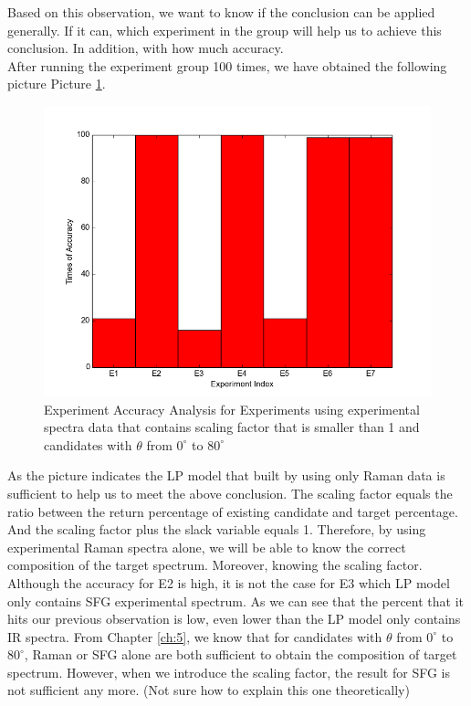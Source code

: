 Based on this observation, we want to know if the conclusion can be applied generally. If it can, which experiment in the group will help us to achieve this conclusion. In addition, with how much accuracy. \\

After running the experiment group 100 times, we have obtained the following picture Picture \ref{fig:6.1}.\\

\begin{figure}[!ht] \label{fig:6.1}
\centering
\includegraphics[scale=0.3]{Figures/chapter6_1.png}
\caption{Experiment Accuracy Analysis for Experiments using experimental spectra data that contains scaling factor that is smaller than 1 and candidates with $\theta$ from $0^{\circ}$ to $80^{\circ}$}
\end{figure}

As the picture indicates the LP model that built by using only Raman data is sufficient to help us to meet the above conclusion. The scaling factor equals the ratio between the return percentage of existing candidate and target percentage. And the scaling factor plus the slack variable equals 1. Therefore, by using experimental Raman spectra alone, we will be able to know the correct composition of the target spectrum. Moreover, knowing the scaling factor. \\
Although the accuracy for E2 is high, it is not the case for E3 which LP model only contains SFG experimental spectrum. As we can see that the percent that it hits our previous observation is low, even lower than the LP model only contains IR spectra. From Chapter \ref{ch:5}, we know that for candidates with $\theta$ from $0^{\circ}$ to $80^{\circ}$, Raman or SFG alone are both sufficient to obtain the composition of target spectrum. However, when we introduce the scaling factor, the result for SFG is not sufficient any more. (Not sure how to explain this one theoretically)\\

